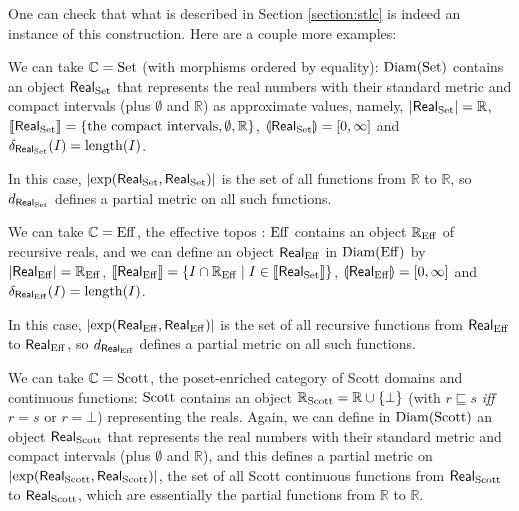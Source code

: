 One can check that what is described in Section \ref{section:stlc} is indeed an instance of this construction. Here are a couple more examples:

\begin{example} We can take $\mathbb{C} = \operatorname{Set}$ (with morphisms ordered by equality): $\operatorname{Diam}(\operatorname{Set})$ contains an object $\mathsf{Real}_{\operatorname{Set}}$ that represents the real numbers with their standard metric and compact intervals (plus $\emptyset$ and $\mathbb{R}$) as approximate values, namely, $\left\vert\mathsf{Real}_{\operatorname{Set}}\right\vert = \mathbb{R}$, $\llbracket \mathsf{Real}_{\operatorname{Set}} \rrbracket = \{ \text{the compact intervals}, \emptyset, \mathbb{R} \}$, $\llparenthesis \mathsf{Real}_{\operatorname{Set}} \rrparenthesis = [0,\infty]$ and $\delta_{\mathsf{Real}_{\operatorname{Set}}}(I) = \operatorname{length}(I)$.

In this case, $\left\vert\exp(\mathsf{Real}_{\operatorname{Set}}, \mathsf{Real}_{\operatorname{Set}})\right\vert$ is the set of all functions from $\mathbb{R}$ to $\mathbb{R}$, so $d_{\mathsf{Real}_{\operatorname{Set}}}$ defines a partial metric on all such functions.
\end{example}

\begin{example} We can take $\mathbb{C} = \operatorname{Eff}$, the effective topos \cite{hyland:effective-topos}: $\operatorname{Eff}$ contains an object $\mathbb{R}_{\operatorname{Eff}}$ of recursive reals, and we can define an object $\mathsf{Real}_{\operatorname{Eff}}$ in $\operatorname{Diam}(\operatorname{Eff})$ by $\left\vert\mathsf{Real}_{\operatorname{Eff}}\right\vert = \mathbb{R}_{\operatorname{Eff}}$, $\llbracket \mathsf{Real}_{\operatorname{Eff}} \rrbracket = \{ I \cap \mathbb{R}_{\operatorname{Eff}} \mid I \in \llbracket \mathsf{Real}_{\operatorname{Set}} \rrbracket \}$, $\llparenthesis \mathsf{Real}_{\operatorname{Eff}} \rrparenthesis = [0,\infty]$ and $\delta_{\mathsf{Real}_{\operatorname{Eff}}}(I) = \operatorname{length}(I)$.

In this case, $\left\vert\exp(\mathsf{Real}_{\operatorname{Eff}}, \mathsf{Real}_{\operatorname{Eff}})\right\vert$ is the set of all recursive functions from $\mathsf{Real}_{\operatorname{Eff}}$ to $\mathsf{Real}_{\operatorname{Eff}}$, so $d_{\mathsf{Real}_{\operatorname{Eff}}}$ defines a partial metric on all such functions.
\end{example}

\begin{example} We can take $\mathbb{C} = \operatorname{Scott}$, the poset-enriched category of Scott domains and continuous functions: $\operatorname{Scott}$ contains an object $\mathbb{R}_{\operatorname{Scott}} = \mathbb{R} \cup \{ \bot \}$ (with $r \sqsubseteq s$ \textit{iff} $r = s$ or $r = \bot$) representing the reals. Again, we can define in  $\operatorname{Diam}(\operatorname{Scott})$ an object $\mathsf{Real}_{\operatorname{Scott}}$ that represents the real numbers with their standard metric and compact intervals (plus $\emptyset$ and $\mathbb{R}$), and this defines a partial metric on $\left\vert\exp(\mathsf{Real}_{\operatorname{Scott}}, \mathsf{Real}_{\operatorname{Scott}})\right\vert$, the set of all Scott continuous functions from $\mathsf{Real}_{\operatorname{Scott}}$ to $\mathsf{Real}_{\operatorname{Scott}}$, which are essentially the partial functions from $\mathbb{R}$ to $\mathbb{R}$.
\end{example}

 